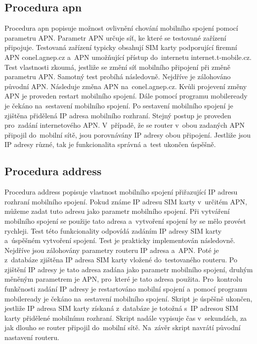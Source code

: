 \subsection{Procedura apn}
Procedura apn popisuje možnost ovlivnění chování mobilního spojení pomocí parametru APN. Parametr APN určuje síť, ke které se testované zařízení připojuje. Testovaná zařízení typicky obsahují SIM karty podporující firemní APN conel.agnep.cz a~APN umožňující přístup do~internetu internet.t-mobile.cz. Test vlastnosti zkoumá, jestliže se změní síť mobilního připojení při změně parametru APN. Samotný test probíhá následovně. Nejdříve je zálohováno původní APN. Následuje změna APN na~conel.agnep.cz. Kvůli projevení změny APN je proveden restart mobilního spojení. Dále pomocí programu mobileready je čekáno na~sestavení mobilního spojení. Po sestavení mobilního spojení je zjištěna přidělená IP adresa mobilního rozhraní. Stejný postup je proveden pro~zadání internetového APN. V~případě, že se router v~obou zadaných APN připojil do~mobilní sítě, jsou porovnávány IP adresy obou připojení. Jestliže jsou IP adresy různé, tak je funkcionalita správná a~test ukončen úspěšně.

\subsection{Procedura address}
Procedura address popisuje vlastnost mobilního spojení přiřazující IP adresu rozhraní mobilního spojení. Pokud známe IP adresu SIM karty v~určitém APN, můžeme zadat tuto adresu jako parametr mobilního spojení. Při vytváření mobilního spojení se použije tato adresa a~vytvoření spojení by se mělo provést rychleji. Test této funkcionality odpovídá zadáním IP adresy SIM karty a~úspěšném vytvoření spojení. Test je prakticky implementován následovně. Nejdříve jsou zálohovány parametry routeru IP adresa a~APN. Poté je z~databáze zjištěna IP adresa SIM karty vložené do~testovaného routeru. Po zjištění IP adresy je tato adresa zadána jako parametr mobilního spojení, druhým měněným parametrem je APN, pro~které je tato adresa použita. Pro~kontrolu funkčnosti zadání IP adresy je restartováno mobilní spojení a~pomocí programu mobileready je čekáno na~sestavení mobilního spojení. Skript je úspěšně ukončen, jestliže IP adresa SIM karty získaná z~databáze je totožná s~IP adresou SIM karty přidělené mobilnímu rozhraní. Skript nadále vypisuje čas v~sekundách, za jak dlouho se router připojil do~mobilní sítě. Na~závěr skript navrátí původní nastavení routeru.

